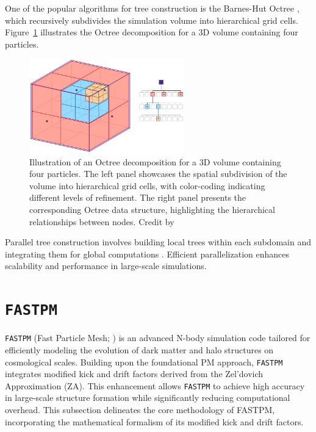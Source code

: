 One of the popular algorithms for tree construction is the Barnes-Hut Octree \citep{1986Natur.324..446B}, which recursively subdivides the simulation volume into hierarchical grid cells. Figure~\ref{fig:barnes-hut} illustrates the Octree decomposition for a 3D volume containing four particles.
\begin{figure}[ht]
    \centering
    \includegraphics[width=0.6\textwidth]{figures/Octree.png}
    \caption{Illustration of an Octree decomposition for a 3D volume containing four particles. The left panel showcases the spatial subdivision of the volume into hierarchical grid cells, with color-coding indicating different levels of refinement. The right panel presents the corresponding Octree data structure, highlighting the hierarchical relationships between nodes. Credit by \citet{Powell2023}}
    \label{fig:barnes-hut}
\end{figure}

Parallel tree construction involves building local trees within each subdomain and integrating them for global computations \citep{DUBINSKI1996133}. Efficient parallelization enhances scalability and performance in large-scale simulations.

\section{\texttt{FASTPM}} \label{sec:fastpm}
\texttt{FASTPM} (Fast Particle Mesh; \citealt{10.1093/mnras/stw2123}) is an advanced N-body simulation code tailored for efficiently modeling the evolution of dark matter and halo structures on cosmological scales. Building upon the foundational PM approach, \texttt{FASTPM} integrates modified kick and drift factors derived from the Zel'dovich Approximation (ZA). This enhancement allows \texttt{FASTPM} to achieve high accuracy in large-scale structure formation while significantly reducing computational overhead. This subsection delineates the core methodology of FASTPM, incorporating the mathematical formalism of its modified kick and drift factors.

